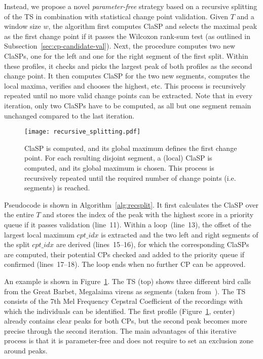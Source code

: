 \documentclass[pdflatex,sn-basic]{sn-jnl}
\begin{document}
Instead, we propose a novel \emph{parameter-free} strategy based on a recursive splitting of the TS in combination with statistical change point validation. Given $T$ and a window size $w$, the algorithm first computes ClaSP and selects the maximal peak as the first change point if it passes the Wilcoxon rank-sum test (as outlined in Subsection~\ref{sec:cp-candidate-val}). Next, the procedure computes two new ClaSPs, one for the left and one for the right segment of the first split. Within these profiles, it checks and picks the largest peak of both profiles as the second change point. It then computes ClaSP for the two new segments, computes the local maxima, verifies and chooses the highest, etc. This process is recursively repeated until no more valid change points can be extracted. Note that in every iteration, only two ClaSPs have to be computed, as all but one segment remain unchanged compared to the last iteration.

\begin{figure}[t]
	\texttt{[image: recursive\_splitting.pdf]}
	\caption{ClaSP is computed, and its global maximum defines the first change point. For each resulting disjoint segment, a (local) ClaSP is computed, and its global maximum is chosen. This process is recursively repeated until the required number of change points (i.e. segments) is reached. \label{fig:ClaSP_recursive_split}
	}
\end{figure}

Pseudocode is shown in Algorithm~\ref{alg:recsplit}. It first calculates the ClaSP over the entire $T$ and stores the index of the peak with the highest score in a priority queue if it passes validation (line~11). Within a loop~(line~13), the offset of the largest local maximum $cpt\_idx$ is extracted and the two left and right segments of the split $cpt\_idx$ are derived (lines~15--16), for which the corresponding ClaSPs are computed, their potential CPs checked and added to the priority queue if confirmed (lines~17--18). The loop ends when no further CP can be approved.

An example is shown in Figure~\ref{fig:ClaSP_recursive_split}. The TS (top) shows three different bird calls from the Great Barbet, Megalaima virens as segments (taken from~\citep{gharghabi2017matrix}). The TS consists of the 7th Mel Frequency Cepstral Coefficient of the recordings with which the individuals can be identified. The first profile (Figure~\ref{fig:ClaSP_recursive_split}, center) already contains clear peaks for both CPs, but the second peak becomes more precise through the second iteration. The main advantages of this iterative process is that it is parameter-free and does not require to set an exclusion zone around peaks. 
\end{document}
